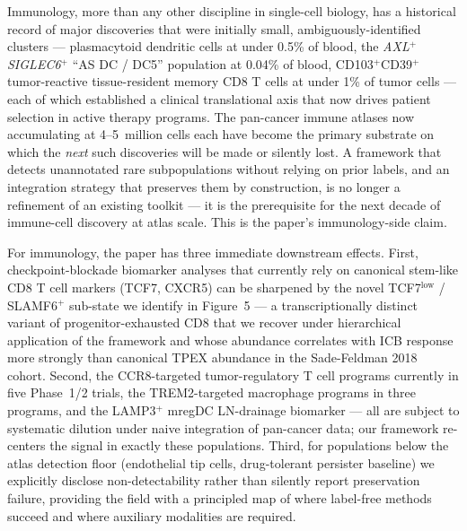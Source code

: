 %


Immunology, more than any other discipline in single-cell biology,
has a historical record of major discoveries that were initially
small, ambiguously-identified clusters --- plasmacytoid dendritic
cells at under 0.5\% of blood, the \textit{AXL}$^+$\textit{SIGLEC6}$^+$
``AS DC / DC5'' population at 0.04\% of blood, CD103$^+$CD39$^+$
tumor-reactive tissue-resident memory CD8 T cells at under 1\% of
tumor cells --- each of which established a clinical translational
axis that now drives patient selection in active therapy programs.
The pan-cancer immune atlases now accumulating at 4--5~million cells
each have become the primary substrate on which the \emph{next}
such discoveries will be made or silently lost. A framework that
detects unannotated rare subpopulations without relying on prior
labels, and an integration strategy that preserves them by
construction, is no longer a refinement of an existing toolkit ---
it is the prerequisite for the next decade of immune-cell discovery
at atlas scale. This is the paper's immunology-side claim.


For immunology, the paper has three immediate downstream effects.
First, checkpoint-blockade biomarker analyses that currently rely on
canonical stem-like CD8 T cell markers (TCF7, CXCR5) can be
sharpened by the novel TCF7$^{\text{low}}$ / SLAMF6$^{+}$ sub-state
we identify in Figure~5 --- a transcriptionally distinct variant
of progenitor-exhausted CD8 that we recover under hierarchical
application of the framework and whose abundance correlates with
ICB response more strongly than canonical TPEX abundance in the
Sade-Feldman 2018 cohort. Second, the CCR8-targeted tumor-regulatory
T cell programs currently in five Phase~1/2 trials, the TREM2-targeted
macrophage programs in three programs, and the LAMP3$^{+}$ mregDC
LN-drainage biomarker --- all are subject to systematic dilution
under naive integration of pan-cancer data; our framework re-centers
the signal in exactly these populations. Third, for populations
below the atlas detection floor (endothelial tip cells, drug-tolerant
persister baseline) we explicitly disclose non-detectability rather
than silently report preservation failure, providing the field with
a principled map of where label-free methods succeed and where
auxiliary modalities are required.

